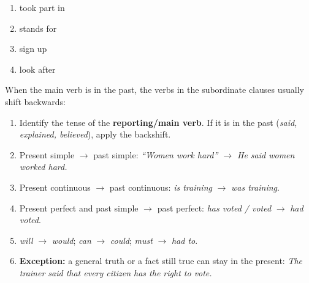 \documentclass[11pt]{article}
\begin{document}
\begin{corrige}
\begin{enumerate}
\item took part in
\item stands for
\item sign up
\item look after
\end{enumerate}
\end{corrige}

\begin{methode}
When the main verb is in the past, the verbs in the subordinate clauses usually shift backwards:
\begin{enumerate}
\item Identify the tense of the \textbf{reporting/main verb}. If it is in the past (\emph{said, explained, believed}), apply the backshift.
\item Present simple $\rightarrow$ past simple: \emph{``Women work hard'' $\rightarrow$ He said women worked hard.}
\item Present continuous $\rightarrow$ past continuous: \emph{is training} $\rightarrow$ \emph{was training}.
\item Present perfect and past simple $\rightarrow$ past perfect: \emph{has voted / voted} $\rightarrow$ \emph{had voted}.
\item \emph{will} $\rightarrow$ \emph{would}; \emph{can} $\rightarrow$ \emph{could}; \emph{must} $\rightarrow$ \emph{had to}.
\item \textbf{Exception:} a general truth or a fact still true can stay in the present: \emph{The trainer said that every citizen has the right to vote.}
\end{enumerate}
\end{methode}
\end{document}
